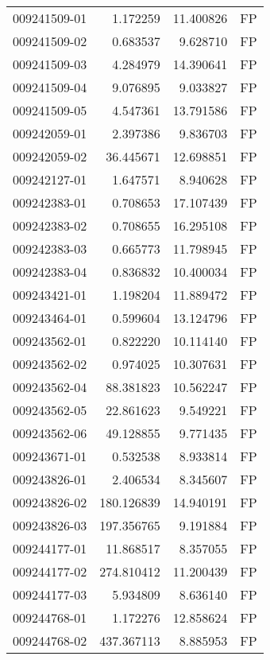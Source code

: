 \begin{tabular}{lrrl}
009241509-01 &    1.172259 &      11.400826 &   FP \\
009241509-02 &    0.683537 &       9.628710 &   FP \\
009241509-03 &    4.284979 &      14.390641 &   FP \\
009241509-04 &    9.076895 &       9.033827 &   FP \\
009241509-05 &    4.547361 &      13.791586 &   FP \\
009242059-01 &    2.397386 &       9.836703 &   FP \\
009242059-02 &   36.445671 &      12.698851 &   FP \\
009242127-01 &    1.647571 &       8.940628 &   FP \\
009242383-01 &    0.708653 &      17.107439 &   FP \\
009242383-02 &    0.708655 &      16.295108 &   FP \\
009242383-03 &    0.665773 &      11.798945 &   FP \\
009242383-04 &    0.836832 &      10.400034 &   FP \\
009243421-01 &    1.198204 &      11.889472 &   FP \\
009243464-01 &    0.599604 &      13.124796 &   FP \\
009243562-01 &    0.822220 &      10.114140 &   FP \\
009243562-02 &    0.974025 &      10.307631 &   FP \\
009243562-04 &   88.381823 &      10.562247 &   FP \\
009243562-05 &   22.861623 &       9.549221 &   FP \\
009243562-06 &   49.128855 &       9.771435 &   FP \\
009243671-01 &    0.532538 &       8.933814 &   FP \\
009243826-01 &    2.406534 &       8.345607 &   FP \\
009243826-02 &  180.126839 &      14.940191 &   FP \\
009243826-03 &  197.356765 &       9.191884 &   FP \\
009244177-01 &   11.868517 &       8.357055 &   FP \\
009244177-02 &  274.810412 &      11.200439 &   FP \\
009244177-03 &    5.934809 &       8.636140 &   FP \\
009244768-01 &    1.172276 &      12.858624 &   FP \\
009244768-02 &  437.367113 &       8.885953 &   FP \\

\end{tabular}
